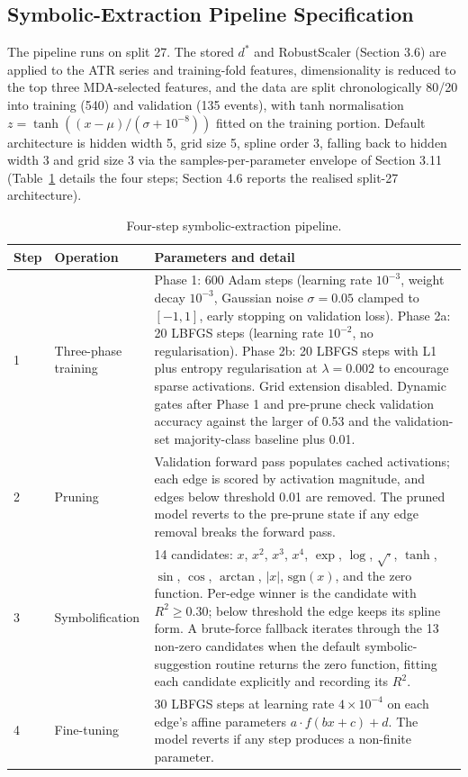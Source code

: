 \documentclass[11pt,a4paper,oneside]{article}
\begin{document}
\vspace{0.2cm}

\subsection{Symbolic-Extraction Pipeline Specification}\label{app:symbolic_details}

The pipeline runs on split 27. The stored $d^{\ast}$ and RobustScaler (Section 3.6) are applied to the ATR series and training-fold features, dimensionality is reduced to the top three MDA-selected features, and the data are split chronologically 80/20 into training (540) and validation (135 events), with tanh normalisation $z = \tanh((x - \mu) / (\sigma + 10^{-8}))$ fitted on the training portion. Default architecture is hidden width 5, grid size 5, spline order 3, falling back to hidden width 3 and grid size 3 via the samples-per-parameter envelope of Section 3.11 (Table~\ref{tab:pykan_pipeline} details the four steps; Section 4.6 reports the realised split-27 architecture).

\begin{table}[H]
\centering
\scriptsize
\setlength{\tabcolsep}{3pt}
\renewcommand{\arraystretch}{0.85}
\begin{tabular}{p{0.5cm}p{2.2cm}p{12cm}}
\toprule
Step & Operation & Parameters and detail \\
\midrule
1 & Three-phase training & Phase 1: 600 Adam steps (learning rate $10^{-3}$, weight decay $10^{-3}$, Gaussian noise $\sigma = 0.05$ clamped to $[-1, 1]$, early stopping on validation loss). Phase 2a: 20 LBFGS steps (learning rate $10^{-2}$, no regularisation). Phase 2b: 20 LBFGS steps with L1 plus entropy regularisation at $\lambda = 0.002$ to encourage sparse activations. Grid extension disabled. Dynamic gates after Phase 1 and pre-prune check validation accuracy against the larger of 0.53 and the validation-set majority-class baseline plus 0.01. \\
\midrule
2 & Pruning & Validation forward pass populates cached activations; each edge is scored by activation magnitude, and edges below threshold 0.01 are removed. The pruned model reverts to the pre-prune state if any edge removal breaks the forward pass. \\
\midrule
3 & Symbolification & 14 candidates: $x$, $x^2$, $x^3$, $x^4$, $\exp$, $\log$, $\sqrt{\cdot}$, $\tanh$, $\sin$, $\cos$, $\arctan$, $|x|$, $\text{sgn}(x)$, and the zero function. Per-edge winner is the candidate with $R^2 \geq 0.30$; below threshold the edge keeps its spline form. A brute-force fallback iterates through the 13 non-zero candidates when the default symbolic-suggestion routine returns the zero function, fitting each candidate explicitly and recording its $R^2$. \\
\midrule
4 & Fine-tuning & 30 LBFGS steps at learning rate $4 \times 10^{-4}$ on each edge's affine parameters $a \cdot f(bx + c) + d$. The model reverts if any step produces a non-finite parameter. \\
\bottomrule
\end{tabular}
\caption{Four-step symbolic-extraction pipeline.}
\label{tab:pykan_pipeline}
\end{table}
\end{document}
